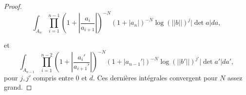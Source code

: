 \documentclass{amsart}
\begin{document}
\begin{proof}
 \begin{equation}
 \int_{A_n}  \prod_{i=1}^{n-1} (1+ |\frac{a_i}{a_{i+1}}|)^{-N} (1+|a_n|)^{-N}\log(||b||)^j|\det a| da,
 \end{equation}
 
 et
 \begin{equation}
 \int_{A_{n-1}}  \prod_{i=1}^{n-2} (1+ |\frac{a_i'}{a_{i+1}'}|)^{-N} (1+|a_{n-1}'|)^{-N}\log(||b'||)^{j'}|\det a'|da',
 \end{equation}
 pour $j, j'$ compris entre $0$ et $d$. Ces dernières intégrales convergent pour $N$ assez grand.

\end{proof}
\end{document}
